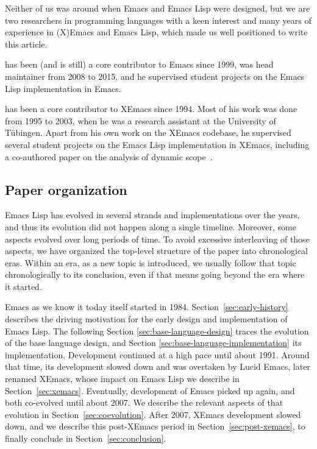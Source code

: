 \documentclass[format=acmsmall, review]{acmart}
\newcommand \Elisp {Emacs Lisp}
\begin{document}
Neither of us was around when Emacs and \Elisp{} were designed, but we are
two researchers in programming languages with a keen interest and many
years of
experience in (X)Emacs and \Elisp{}, which made us well positioned to write
this article.

\smallskip

 has been (and is still) a core contributor to
Emacs since 1999, was head maintainer from 2008 to 2015, and he supervised
student projects on the \Elisp{} implementation in Emacs.

\smallskip

 has been a core contributor to XEmacs since 1994.
Most of his work was done from 1995 to 2003, when he was a research
assistant at the University of Tübingen.  Apart from his own work on
the XEmacs codebase, he supervised several student projects on the
\Elisp{} implementation in XEmacs, including a co-authored paper on the
analysis of dynamic scope~\cite{Neubauer01}.

\subsection{Paper organization}

\Elisp{} has evolved in several strands and implementations over the
years, and thus its evolution did not happen along a single timeline.
Moreover, some aspects evolved over long periods of time.  To avoid
excessive interleaving of those aspects, we have organized the
top-level structure of the paper into chronological eras.  Within an
era, as a new topic is introduced, we usually follow that topic
chronologically to its conclusion, even if that means going beyond the
era where it started.

Emacs as we know it today itself started in 1984.
Section~\ref{sec:early-history} describes the driving motivation for
the early design and implementation of \Elisp.  The following Section
\ref{sec:base-language-design} traces the evolution of the base
language design, and Section \ref{sec:base-language-implementation}
its implementation.
Development continued at a high pace until about 1991.
Around that time, its development slowed down and
was overtaken by Lucid Emacs, later renamed XEmacs, whose impact on
\Elisp{} we describe in Section~\ref{sec:xemacs}.  Eventually,
development of Emacs picked up again, and both co-evolved until about
2007.  We describe the relevant aspects of that evolution in
Section~\ref{sec:coevolution}.  After 2007, XEmacs development slowed
down, and we describe this post-XEmacs period in
Section~\ref{sec:post-xemacs}, to finally conclude in
Section~\ref{sec:conclusion}.
\end{document}
